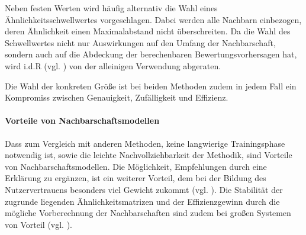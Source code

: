 Neben festen Werten wird häufig alternativ die Wahl eines Ähnlichkeitsschwellwertes vorgeschlagen. Dabei werden alle Nachbarn einbezogen, deren Ähnlichkeit einen Maximalabstand nicht überschreiten. Da die Wahl des Schwellwertes nicht nur Auswirkungen auf den Umfang der Nachbarschaft, sondern auch auf die Abdeckung der berechenbaren Bewertungsvorhersagen hat, wird i.d.R (vgl. \citep{Herlocker:2002:EAD:593967.594047, Herlocker:1999:AFP:312624.312682}) von der alleinigen Verwendung abgeraten.

Die Wahl der konkreten Größe ist bei beiden Methoden zudem in jedem Fall ein Kompromiss zwischen Genauigkeit, Zufälligkeit und Effizienz.

\paragraph{Vorteile von Nachbarschaftsmodellen} Dass zum Vergleich mit anderen Methoden, keine langwierige Trainingsphase notwendig ist, sowie die leichte Nachvollziehbarkeit der Methodik, sind Vorteile von Nachbarschaftsmodellen. Die Möglichkeit, Empfehlungen durch eine Erklärung zu ergänzen, ist ein weiterer Vorteil, dem bei der Bildung des Nutzervertrauens besonders viel Gewicht zukommt (vgl. \citep{hb_15}). Die Stabilität der zugrunde liegenden Ähnlichkeitsmatrizen und der Effizienzgewinn durch die mögliche Vorberechnung der Nachbarschaften sind zudem bei großen Systemen von Vorteil (vgl. \citep{linden03}).\citep{hb_04} %
